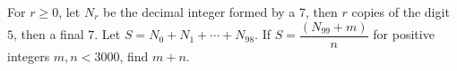 For $r\ge0$, let $N_r$ be the decimal integer formed by a $7$, then $r$ copies of the digit $5$, then a final $7$. Let $S=N_0+N_1+\cdots+N_{98}$. If $S=\dfrac{(N_{99}+m)}{n}$ for positive integers $m,n<3000$, find $m+n$.
